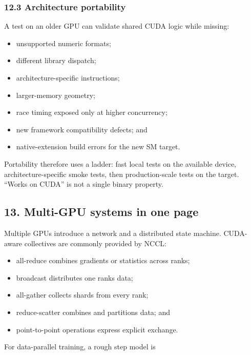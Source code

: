 \documentclass[
  10pt,
  letterpaper,
]{article}
\providecommand{\tightlist}{%
  \setlength{\itemsep}{0pt}\setlength{\parskip}{0pt}}
\begin{document}
\subsubsection{12.3 Architecture
portability}\label{123-architecture-portability}

A test on an older GPU can validate shared CUDA logic while missing:

\begin{itemize}
\tightlist
\item
  unsupported numeric formats;
\item
  different library dispatch;
\item
  architecture-specific instructions;
\item
  larger-memory geometry;
\item
  race timing exposed only at higher concurrency;
\item
  new framework compatibility defects; and
\item
  native-extension build errors for the new SM target.
\end{itemize}

Portability therefore uses a ladder: fast local tests on the available
device, architecture-specific smoke tests, then production-scale tests
on the target. ``Works on CUDA'' is not a single binary property.

\subsection{13. Multi-GPU systems in one
page}\label{13-multi-gpu-systems-in-one-page}

Multiple GPUs introduce a network and a distributed state machine.
CUDA-aware collectives are commonly provided by NCCL:

\begin{itemize}
\tightlist
\item
  all-reduce combines gradients or statistics across ranks;
\item
  broadcast distributes one rank\textquotesingle s data;
\item
  all-gather collects shards from every rank;
\item
  reduce-scatter combines and partitions data; and
\item
  point-to-point operations express explicit exchange.
\end{itemize}

For data-parallel training, a rough step model is
\end{document}
